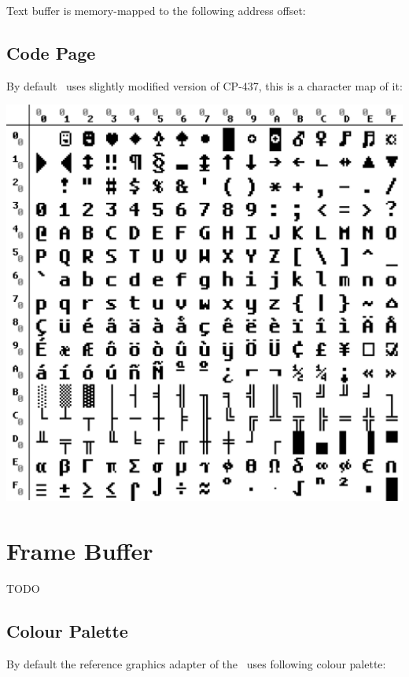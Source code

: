 Text buffer is memory-mapped to the following address offset:


\subsection{Code Page}
\label{codepage}

By default \thismachine\ uses slightly modified version of CP-437, this is a character map of it:

{\centering
\includegraphics[width=\linewidth]{tsvmcp.png}
\label{fig:codepage}
}
\newpage


\section{Frame Buffer}

TODO

\subsection{Colour Palette}
\label{colourpalette}

By default the reference graphics adapter of the \thismachine\ uses following colour palette:

